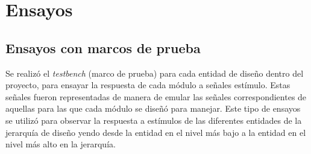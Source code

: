 \chapter{Ensayos} %

\label{Chapter3} %



\section{Ensayos con marcos de prueba}
\label{Sección: Ensayos con marcos de prueba}
Se realizó el \textit{testbench} (marco de prueba) para cada entidad de diseño dentro del proyecto, para ensayar la respuesta de cada módulo a señales estímulo. Estas señales fueron representadas de manera de emular las señales correspondientes de aquellas para las que cada módulo se diseñó para manejar. Este tipo de ensayos se utilizó para observar la respuesta a estímulos de las diferentes entidades de la jerarquía de diseño yendo desde la entidad en el nivel más bajo a la entidad en el nivel más alto en la jerarquía.


